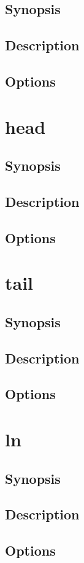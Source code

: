 \documentclass[a4paper, 10pt, onecolumn, openright, oneside]{book}
\begin{document}
			\subsection{Synopsis}
			\subsection{Description}
			\subsection{Options}
		\section{head}
			\subsection{Synopsis}
			\subsection{Description}
			\subsection{Options}
		\section{tail}
			\subsection{Synopsis}
			\subsection{Description}
			\subsection{Options}
		\section{ln}
			\subsection{Synopsis}
			\subsection{Description}
			\subsection{Options}
\end{document}
